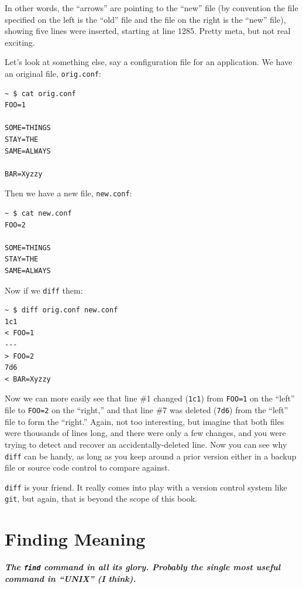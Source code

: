 \documentclass[10pt,]{book}
\numberwithin{figure}{chapter}
\begin{document}
In other words, the ``arrows'' are pointing to the ``new'' file (by
convention the file specified on the left is the ``old'' file and the
file on the right is the ``new'' file), showing five lines were
inserted, starting at line 1285. Pretty meta, but not real exciting.

Let's look at something else, say a configuration file for an
application. We have an original file, \texttt{orig.conf}:

\begin{verbatim}
~ $ cat orig.conf
FOO=1

SOME=THINGS
STAY=THE
SAME=ALWAYS

BAR=Xyzzy
\end{verbatim}

Then we have a new file, \texttt{new.conf}:

\begin{verbatim}
~ $ cat new.conf
FOO=2

SOME=THINGS
STAY=THE
SAME=ALWAYS
\end{verbatim}

Now if we \texttt{diff} them:

\begin{verbatim}
~ $ diff orig.conf new.conf
1c1
< FOO=1
---
> FOO=2
7d6
< BAR=Xyzzy
\end{verbatim}

Now we can more easily see that line \#1 changed (\texttt{1c1}) from
\texttt{FOO=1} on the ``left'' file to \texttt{FOO=2} on the ``right,''
and that line \#7 was deleted (\texttt{7d6}) from the ``left'' file to
form the ``right.'' Again, not too interesting, but imagine that both
files were thousands of lines long, and there were only a few changes,
and you were trying to detect and recover an accidentally-deleted line.
Now you can see why \texttt{diff} can be handy, as long as you keep
around a prior version either in a backup file or source code control to
compare against.

\texttt{diff} is your friend. It really comes into play with a version
control system like \texttt{git}, but again, that is beyond the scope of
this book.

\chapter{Finding Meaning}\label{finding-meaning}

\textbf{\emph{The \texttt{find} command in all its glory. Probably the
single most useful command in ``UNIX'' (I think).}}
\end{document}
